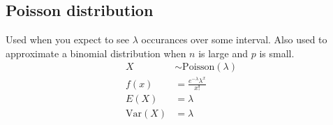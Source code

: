 \documentclass{article}
\newcommand{\var}{\text{Var}}
\newcommand{\poisson}{\text{Poisson}}
\begin{document}
\begin{multicols*}{2}
\subsection{Poisson distribution}
Used when you expect to see $\lambda$ occurances over some interval. Also used to approximate a binomial distribution when $n$ is large and $p$ is small.
\begin{align*}
    X &\sim \poisson(\lambda) \\
    f(x) &= \frac{e^{-\lambda} \lambda^x}{x!} \\
    E(X) &= \lambda \\
    \var(X) &= \lambda
\end{align*}

\end{multicols*}
\end{document}
